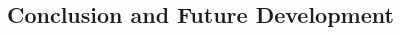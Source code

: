 \documentclass[11pt]{article}
\begin{document}
\begin{spacing}{2}
\section{Conclusion and Future Development}


\end{spacing}
\end{document}
